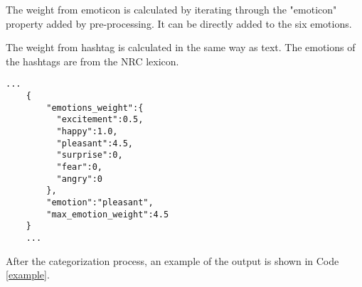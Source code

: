 The weight from emoticon is calculated by iterating through the "emoticon" property added by pre-processing. It can be directly added to the six emotions.

The weight from hashtag is calculated in the same way as text. The emotions of the hashtags are from the NRC lexicon.

\begin{lstlisting}[caption={Tweet Example},captionpos=b,label={example}]
    ...
    {
        "emotions_weight":{
          "excitement":0.5,
          "happy":1.0,
          "pleasant":4.5,
          "surprise":0,
          "fear":0,
          "angry":0
        },
        "emotion":"pleasant",
        "max_emotion_weight":4.5
    }
    ...
\end{lstlisting}

After the categorization process, an example of the output is shown in Code \ref{example}.
